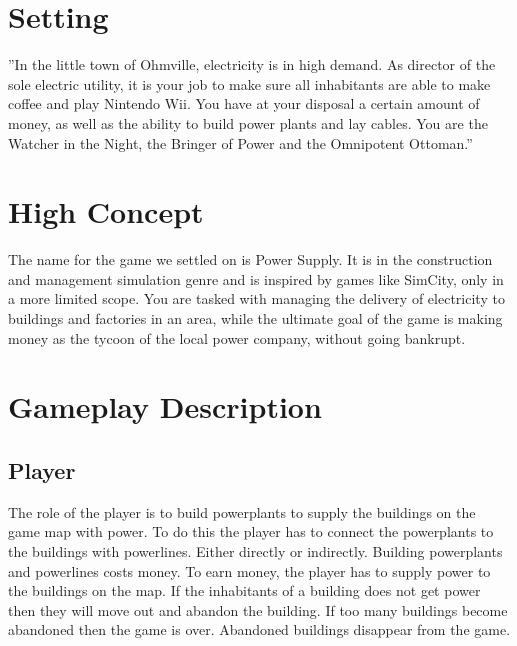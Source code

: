 \section{Setting}
    ”In the little town of Ohmville, electricity is in high demand. As director of the sole electric
    utility, it is your job to make sure all inhabitants are able to make coffee and play Nintendo
    Wii\texttrademark. You have at your disposal a certain amount of money, as well as the ability to build
    power plants and lay cables. You are the Watcher in the Night, the Bringer of Power and the
    Omnipotent Ottoman.”

\section{High Concept}
    The name for the game we settled on is Power Supply. It is in the construction and management 
    simulation genre and is inspired by games like SimCity, only in a more limited scope. You are 
    tasked with managing the delivery of electricity to buildings and factories in an area, while the 
    ultimate goal of the game is making money as the tycoon of the local power company, without going 
    bankrupt.

\section{Gameplay Description}

\subsection*{Player}
    The role of the player is to build powerplants to supply the buildings on the game map with power. 
    To do this the player has to connect the powerplants to the buildings with powerlines. Either directly
    or indirectly. Building powerplants and powerlines costs money. To earn money, the player has to supply
    power to the buildings on the map. If the inhabitants of a building does not get power then they will
    move out and abandon the building. If too many buildings become abandoned then the game is over.
    Abandoned buildings disappear from the game.

